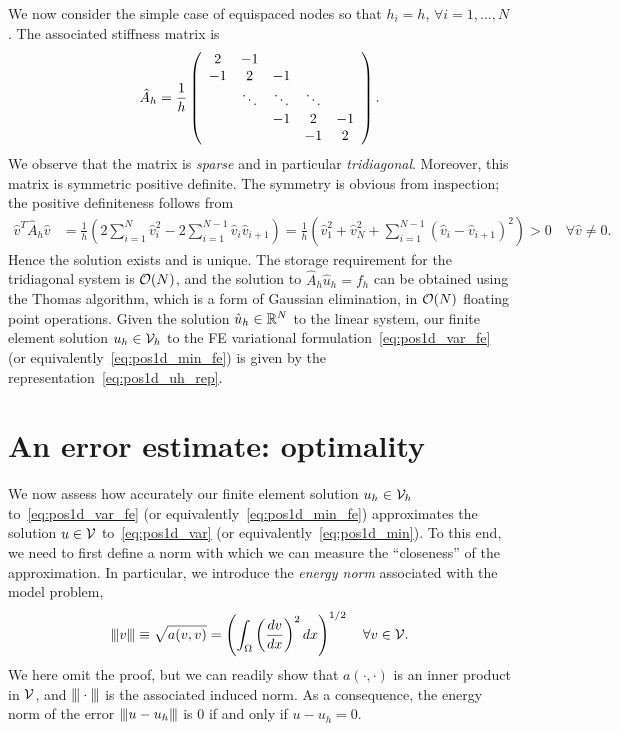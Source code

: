 We now consider the simple case of equispaced nodes so that $h_i = h$, $\forall i = 1,\dots,N$.  The associated stiffness matrix is
\begin{equation*}
  \hat A_h = \frac{1}{h} \bmat{ccccc} 2 & -1 \\ -1 & 2 & -1 \\ & \ddots & \ddots & \ddots \\ & &-1 & 2 & -1 \\ &&& -1 & 2 \emat.
\end{equation*}
We observe that the matrix is \emph{sparse} and in particular \emph{tridiagonal}.  Moreover, this matrix is symmetric positive definite.  The symmetry is obvious from inspection; the positive definiteness follows from 
\begin{align*}
  \hat v^T \hat A_h \hat v
  &=
  \frac{1}{h} \left(
  2\sum_{i=1}^N \hat v_i^2 - 2\sum_{i=1}^{N-1} \hat v_i\hat v_{i+1} 
  \right)
  =
  \frac{1}{h} \left(
  \hat v_1^2 + \hat v_{N}^2 + \sum_{i=1}^{N-1} (\hat v_i - \hat v_{i+1})^2 
  \right)
  > 0 \quad \forall \hat v \neq 0.
\end{align*}
Hence the solution exists and is unique.  The storage requirement for the tridiagonal system is $\calO(N)$, and the solution to $\hat A_h \hat u_h = f_h$ can be obtained using the Thomas algorithm, which is a form of Gaussian elimination, in $\calO(N)$ floating point operations.  Given the solution  $\hat u_h \in \RR^N$ to the linear system, our finite element solution $u_h \in \calV_h$ to the FE variational formulation~\eqref{eq:pos1d_var_fe} (or equivalently~\eqref{eq:pos1d_min_fe}) is given by the representation~\eqref{eq:pos1d_uh_rep}.

\section{An error estimate: optimality}
We now assess how accurately our finite element solution $u_h \in \calV_h$ to~\eqref{eq:pos1d_var_fe} (or equivalently~\eqref{eq:pos1d_min_fe}) approximates the solution $u \in \calV$ to~\eqref{eq:pos1d_var} (or equivalently~\eqref{eq:pos1d_min}).  To this end, we need to first define a norm with which we can measure the ``closeness'' of the approximation. In particular, we introduce the \emph{energy norm} associated with the model problem,
\begin{equation*}
  \enorm{v} \equiv \sqrt{a(v,v)}  = \left( \int_{\Omega} \left( \dd{v}{x} \right)^2 dx \right)^{1/2} \quad \forall v \in \calV.
\end{equation*}
We here omit the proof, but we can readily show that $a(\cdot,\cdot)$ is an inner product in $\calV$, and $\enorm{\cdot}$ is the associated induced norm.  As a consequence, the energy norm of the error $\enorm{u - u_h}$ is 0 if and only if $u - u_h = 0$.

